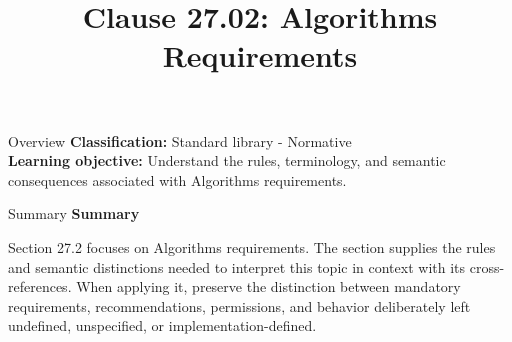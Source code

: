 \documentclass[10pt,letterpaper]{article}
\title{Clause 27.02: Algorithms Requirements}
\author{}
\date{}
\begin{document}
\maketitle
\begin{CornellOverviewBox}{Overview}
\textbf{Classification:} Standard library - Normative\\[2pt]
\textbf{Learning objective:} Understand the rules, terminology, and semantic consequences associated with Algorithms requirements.
\end{CornellOverviewBox}\begin{CornellSummaryBox}{Summary}
{\sffamily\bfseries\color{Accent} Summary}\par\vspace{3pt}Section 27.2 focuses on Algorithms requirements. The section supplies the rules and semantic distinctions needed to interpret this topic in context with its cross-references. When applying it, preserve the distinction between mandatory requirements, recommendations, permissions, and behavior deliberately left undefined, unspecified, or implementation-defined.
\end{CornellSummaryBox}
\end{document}
